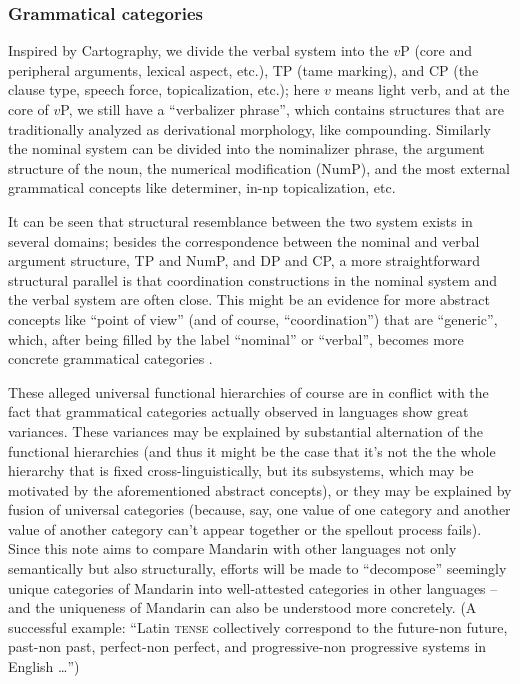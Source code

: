 \documentclass[UTF8, a4paper, oneside, scheme=plain, 12pt]{ctexrep}
\newcommand*{\category}[1]{\textsc{#1}}
\begin{document}
{\subsubsection{Grammatical categories}

Inspired by Cartography, 
we divide the verbal system into the $v$P 
(core and peripheral arguments, lexical aspect, etc.), 
TP (\ac{tame} marking), 
and CP (the clause type, speech force, topicalization, etc.); 
here $v$ means light verb, 
and at the core of $v$P, 
we still have a ``verbalizer phrase'', 
which contains structures that are traditionally analyzed 
as derivational morphology, 
like compounding.
Similarly the nominal system can be divided into 
the nominalizer phrase, 
the argument structure of the noun, 
the numerical modification (NumP), 
and the most external grammatical concepts like 
determiner, in-\acs{np} topicalization, etc. 

It can be seen that structural resemblance between the two system 
exists in several domains; 
besides the correspondence between 
the nominal and verbal argument structure, 
TP and NumP, 
and DP and CP, 
a more straightforward structural parallel 
is that coordination constructions in the nominal system 
and the verbal system are often close. 
This might be an evidence for more abstract concepts 
like ``point of view'' (and of course, ``coordination'')
that are ``generic'', 
which, after being filled by the label ``nominal'' or ``verbal'', 
becomes more concrete grammatical categories
\citep{wiltschko2014universal}. 

These alleged universal functional hierarchies
of course are in conflict with the fact that 
grammatical categories actually observed in languages 
show great variances. 
These variances may be explained by substantial alternation 
of the functional hierarchies 
(and thus it might be the case that 
it's not the the whole hierarchy that is fixed cross-linguistically,
but its subsystems, which may be motivated by the aforementioned abstract concepts),
or they may be explained by fusion of universal categories 
(because, say, one value of one category and another value of another category 
can't appear together or the spellout process fails).
Since this note aims to compare Mandarin with other languages 
not only semantically but also structurally, 
efforts will be made to ``decompose'' seemingly unique 
categories of Mandarin into well-attested categories in other languages -- 
and the uniqueness of Mandarin can also be understood more concretely. 
(A successful example: ``Latin \category{tense} 
collectively correspond to the future-non future, 
past-non past, perfect-non perfect, and progressive-non progressive 
systems in English \dots'')



}
\end{document}
